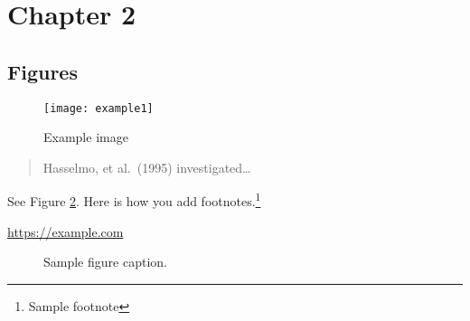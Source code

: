 \section{Chapter 2}

\subsection{Figures}

\lipsum[10]

\begin{figure}[h]
    \centering
    \texttt{[image: example1]}
    \caption{Example image}
    \label{fig:image0}
\end{figure}

\begin{quote}
  Hasselmo, et al.\ (1995) investigated\dots
\end{quote}

See Figure \ref{fig:fig1}. Here is how you add footnotes.\footnote{Sample footnote}

\lipsum[2]

\begin{center}
  \url{https://example.com}
\end{center}

\begin{figure}[h]
  \centering
  \fbox{\rule[-.5cm]{4cm}{4cm} \rule[-.5cm]{4cm}{0cm}}
  \caption{Sample figure caption.}
  \label{fig:fig1}
\end{figure}


\lipsum[9]
